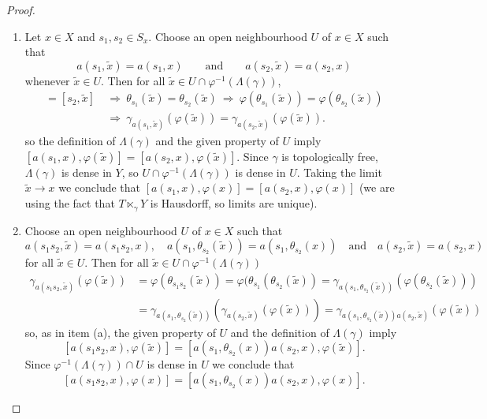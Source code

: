 \begin{proof}
\begin{enumerate}
\item[(a)] Let $x\in X$ and $s_1, s_2 \in S_x$. Choose an open neighbourhood $U$ of $x\in X$ such that
\[a(s_1, \widetilde{x})=a(s_1, x)\qquad\text{and}\qquad a(s_2, \widetilde{x})=a(s_2, x)\]
whenever $\widetilde{x}\in U$. Then for all $\widetilde{x}\in U\cap\varphi^{-1}(\Lambda(\gamma))$,
\begin{align*}
[s_1,\widetilde{x}]=[s_2,\widetilde{x}]
      & \ \Longrightarrow \ \theta_{s_1}(\widetilde{x})=\theta_{s_2}(\widetilde{x})
        \ \Longrightarrow \ \varphi(\theta_{s_1}(\widetilde{x}))=\varphi(\theta_{s_2}(\widetilde{x}))  \\
      & \ \Longrightarrow \ \gamma_{a(s_1,\widetilde{x})}(\varphi(\widetilde{x}))=\gamma_{a(s_2,\widetilde{x})}(\varphi(\widetilde{x})).        
\end{align*}
so the definition of $\Lambda(\gamma)$ and the given property of $U$ imply $[a(s_1,x),\varphi(\widetilde{x})]=[a(s_2,x),\varphi(\widetilde{x})]$. Since $\gamma$ is topologically free, $\Lambda(\gamma)$ is dense in $Y$, so $U\cap\varphi^{-1}(\Lambda(\gamma))$ is dense in $U$. Taking the limit $\widetilde{x}\to x$ we conclude that $[a(s_1,x),\varphi(x)]=[a(s_2,x),\varphi(x)]$ (we are using the fact that $T\ltimes_\gamma Y$ is Hausdorff, so limits are unique).

\item[(b)] Choose an open neighbourhood $U$ of $x \in X$ such that 
\[a(s_1s_2,\widetilde{x})=a(s_1s_2,x),\quad a(s_1,\theta_{s_2}(\widetilde{x}))= a(s_1,\theta_{s_2}(x))\quad\text{and}\quad a(s_2, \widetilde{x}) = a(s_2,x)\]
for all $\widetilde{x} \in U$. Then for all $\widetilde{x} \in U \cap\varphi^{-1}(\Lambda(\gamma))$
\begin{align*}
  \gamma_{a(s_1s_2, \widetilde{x})}(\varphi(\widetilde{x})) 
     & = \varphi(\theta_{s_1s_2}(\widetilde{x})) 
       = \varphi(\theta_{s_1}(\theta_{s_2}(\widetilde{x})) 
       = \gamma_{a(s_1,\theta_{s_2}(\widetilde{x}))}(\varphi(\theta_{s_2}(\widetilde{x}))) \\
     & = \gamma_{a(s_1, \theta_{s_2}(\widetilde{x}))}(\gamma_{a(s_2, \widetilde{x})}(\varphi(\widetilde{x})))
       = \gamma_{a(s_1, \theta_{s_2}(\widetilde{x}))a(s_2, \widetilde{x})}(\varphi(\widetilde{x}))
\end{align*}
so, as in item (a), the given property of $U$ and the definition of $\Lambda(\gamma)$ imply
\[[a(s_1s_2,x),\varphi(\widetilde{x})]=[a(s_1, \theta_{s_2}(x))a(s_2, x),\varphi(\widetilde{x})].\]
Since $\varphi^{-1}(\Lambda(\gamma))\cap U$ is dense in $U$ we conclude that
\[[a(s_1s_2,x),\varphi(x)]=[a(s_1,\theta_{s_2}(x))a(s_2,x),\varphi(x)].\]


\end{enumerate}
\end{proof}
